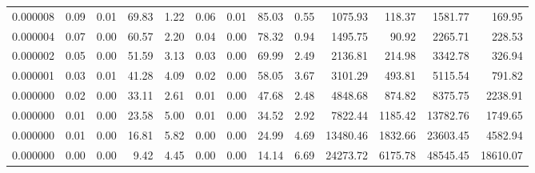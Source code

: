 \begin{tabular}{lrrrrrrrrrrrr}
0.000008 & 0.09 & 0.01 & 69.83 & 1.22 & 0.06 & 0.01 & 85.03 & 0.55 & 1075.93 & 118.37 & 1581.77 & 169.95 \\
0.000004 & 0.07 & 0.00 & 60.57 & 2.20 & 0.04 & 0.00 & 78.32 & 0.94 & 1495.75 & 90.92 & 2265.71 & 228.53 \\
0.000002 & 0.05 & 0.00 & 51.59 & 3.13 & 0.03 & 0.00 & 69.99 & 2.49 & 2136.81 & 214.98 & 3342.78 & 326.94 \\
0.000001 & 0.03 & 0.01 & 41.28 & 4.09 & 0.02 & 0.00 & 58.05 & 3.67 & 3101.29 & 493.81 & 5115.54 & 791.82 \\
0.000000 & 0.02 & 0.00 & 33.11 & 2.61 & 0.01 & 0.00 & 47.68 & 2.48 & 4848.68 & 874.82 & 8375.75 & 2238.91 \\
0.000000 & 0.01 & 0.00 & 23.58 & 5.00 & 0.01 & 0.00 & 34.52 & 2.92 & 7822.44 & 1185.42 & 13782.76 & 1749.65 \\
0.000000 & 0.01 & 0.00 & 16.81 & 5.82 & 0.00 & 0.00 & 24.99 & 4.69 & 13480.46 & 1832.66 & 23603.45 & 4582.94 \\
0.000000 & 0.00 & 0.00 & 9.42 & 4.45 & 0.00 & 0.00 & 14.14 & 6.69 & 24273.72 & 6175.78 & 48545.45 & 18610.07 \\
\bottomrule
\end{tabular}
